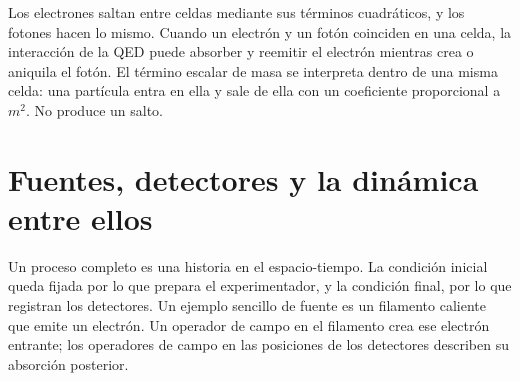 \begin{classroomqa}
\end{classroomqa}

Los electrones saltan entre celdas mediante sus términos cuadráticos, y los fotones hacen lo mismo. Cuando un electrón y un fotón coinciden en una celda, la interacción de la QED puede absorber y reemitir el electrón mientras crea o aniquila el fotón. El término escalar de masa se interpreta dentro de una misma celda: una partícula entra en ella y sale de ella con un coeficiente proporcional a \(m^2\). No produce un salto.

\begin{classroomqa}
\end{classroomqa}

\begin{classroomqa}
\end{classroomqa}

\section{Fuentes, detectores y la dinámica entre ellos}

Un proceso completo es una historia en el espacio-tiempo. La condición inicial queda fijada por lo que prepara el experimentador, y la condición final, por lo que registran los detectores. Un ejemplo sencillo de fuente es un filamento caliente que emite un electrón. Un operador de campo en el filamento crea ese electrón entrante; los operadores de campo en las posiciones de los detectores describen su absorción posterior.

